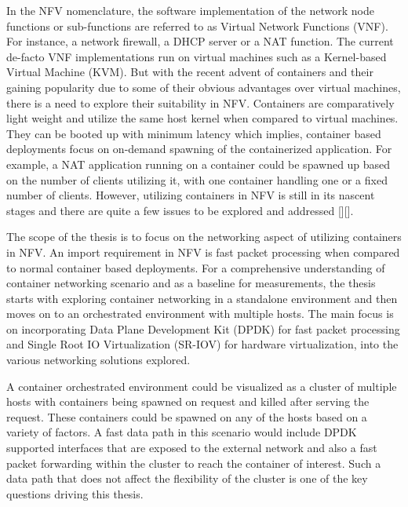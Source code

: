 \documentclass[english, 12pt, a4paper, elec, utf8, a-1b, online]{aaltothesis}
\begin{document}
In the NFV nomenclature, the software implementation of the network node functions or sub-functions are referred to as Virtual Network Functions (VNF). For instance, a network firewall, a DHCP server or a NAT function. The current de-facto VNF implementations run on virtual machines such as a Kernel-based Virtual Machine (KVM). But with the recent advent of containers and their gaining popularity due to some of their obvious advantages over virtual machines, there is a need to explore their suitability in NFV. Containers are comparatively light weight and utilize the same host kernel when compared to virtual machines. They can be booted up with minimum latency\cite{container-vm-comparison} which implies, container based deployments focus on on-demand spawning of the containerized application. For example, a NAT application running on a container could be spawned up based on the number of clients utilizing it, with one container handling one or a fixed number of clients. However, utilizing containers in NFV is still in its nascent stages and there are quite a few issues to be explored and addressed [][].

The scope of the thesis is to focus on the networking aspect of utilizing containers in NFV. An import requirement in NFV is fast packet processing when compared to normal container based deployments. For a comprehensive understanding of container networking scenario and as a baseline for measurements, the thesis starts with exploring container networking in a standalone environment and then moves on to an orchestrated environment with multiple hosts. The main focus is on incorporating Data Plane Development Kit (DPDK) for fast packet processing and Single Root IO Virtualization (SR-IOV) for hardware virtualization, into the various networking solutions explored.

A container orchestrated environment could be visualized as a cluster of multiple hosts with  containers being spawned on request and killed after serving the request. These containers could be spawned on any of the hosts based on a variety of factors. A fast data path in this scenario would include DPDK supported interfaces that are exposed to the external network and also a fast packet forwarding within the cluster to reach the container of interest. Such a data path that does not affect the flexibility of the cluster is one of the key questions driving this thesis. 
\end{document}
